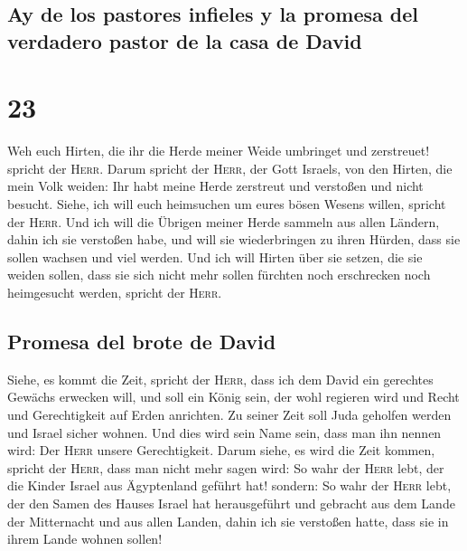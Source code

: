\hypertarget{ay-de-los-pastores-infieles-y-la-promesa-del-verdadero-pastor-de-la-casa-de-david}{%
\subsection{Ay de los pastores infieles y la promesa del verdadero
pastor de la casa de
David}\label{ay-de-los-pastores-infieles-y-la-promesa-del-verdadero-pastor-de-la-casa-de-david}}

\hypertarget{section-22}{%
\section{23}\label{section-22}}

 Weh euch Hirten, die ihr die Herde meiner Weide umbringet
und zerstreuet! spricht der \textsc{Herr}.  Darum spricht
der \textsc{Herr}, der Gott Israels, von den Hirten, die mein Volk
weiden: Ihr habt meine Herde zerstreut und verstoßen und nicht besucht.
Siehe, ich will euch heimsuchen um eures bösen Wesens willen, spricht
der \textsc{Herr}.  Und ich will die Übrigen meiner Herde
sammeln aus allen Ländern, dahin ich sie verstoßen habe, und will sie
wiederbringen zu ihren Hürden, dass sie sollen wachsen und viel werden.
 Und ich will Hirten über sie setzen, die sie weiden
sollen, dass sie sich nicht mehr sollen fürchten noch erschrecken noch
heimgesucht werden, spricht der \textsc{Herr}.

\hypertarget{promesa-del-brote-de-david}{%
\subsection{Promesa del brote de
David}\label{promesa-del-brote-de-david}}

 Siehe, es kommt die Zeit, spricht der \textsc{Herr}, dass
ich dem David ein gerechtes Gewächs erwecken will, und soll ein König
sein, der wohl regieren wird und Recht und Gerechtigkeit auf Erden
anrichten.  Zu seiner Zeit soll Juda geholfen werden und
Israel sicher wohnen. Und dies wird sein Name sein, dass man ihn nennen
wird: Der \textsc{Herr} unsere Gerechtigkeit.  Darum
siehe, es wird die Zeit kommen, spricht der \textsc{Herr}, dass man
nicht mehr sagen wird: So wahr der \textsc{Herr} lebt, der die Kinder
Israel aus Ägyptenland geführt hat!  sondern: So wahr der
\textsc{Herr} lebt, der den Samen des Hauses Israel hat herausgeführt
und gebracht aus dem Lande der Mitternacht und aus allen Landen, dahin
ich sie verstoßen hatte, dass sie in ihrem Lande wohnen sollen!

